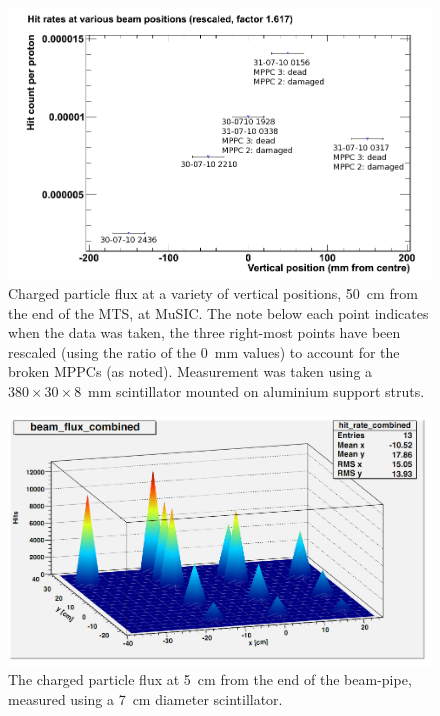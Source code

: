 \begin{figure}[hptb]
  \centering
    \includegraphics[width=.9\textwidth]{images/hit_rate_rescaled.png}
  \caption{Charged particle flux at a variety of vertical positions, 50~cm from the end of the MTS, at MuSIC. The note below each point indicates when the data was taken, the three right-most points have been rescaled (using the ratio of the 0~mm values) to account for the broken MPPCs (as noted). Measurement was taken using a \( 380\times30\times8 \)~mm scintillator mounted on aluminium support struts.}
  \label{fig:1D_hit_rate_rescaled}
\end{figure}

\begin{figure}[hptb]
  \centering
    \includegraphics[width=.9\textwidth]{images/2D_hit_rate_dist.png}
  \caption{The charged particle flux at 5~cm from the end of the beam-pipe, measured using a 7~cm diameter scintillator.}
  \label{fig:2D_hit_rate_dist}
\end{figure}


